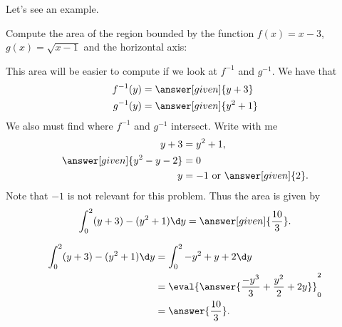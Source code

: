 \documentclass{ximera}
\begin{document}
Let's see an example.

\begin{example}
  Compute the area of the region bounded by the function $f(x) = x-3$,
  $g(x) = \sqrt{x-1}$ and the horizontal axis:
\begin{image}
\end{image}
\begin{explanation}
  This area will be easier to compute if we look at $f^{-1}$ and $g^{-1}$. We have that
  \begin{align*}
    f^{-1}(y) &= \answer[given]{y+3}\\
    g^{-1}(y) &= \answer[given]{y^2 +1}
  \end{align*}
  We also must find where $f^{-1}$ and $g^{-1}$ intersect. Write with me
  \begin{align*}
    y+3 &= y^2 +1,\\
    \answer[given]{y^2-y-2} &= 0\\
    y &= -1 \text{ or }\answer[given]{2}.
  \end{align*}
  Note that $-1$ is not relevant for this problem.  Thus the area is
  given by
  \[
  \int_{0}^{2}(y+3) - (y^2+1)\d y = \answer[given]{\frac{10}{3}}.
  \]
  \begin{hint}
    \begin{align*}
      \int_0^2 (y+3) - (y^2+1) \d y &= \int_0^2 -y^2+y+2 \d y\\
      &=\eval{\answer{\frac{-y^3}{3} + \frac{y^2}{2}+2y}}_0^2\\
      &=\answer{\frac{10}{3}}.
    \end{align*}
  \end{hint}
\end{explanation}
\end{example}



\end{document}
